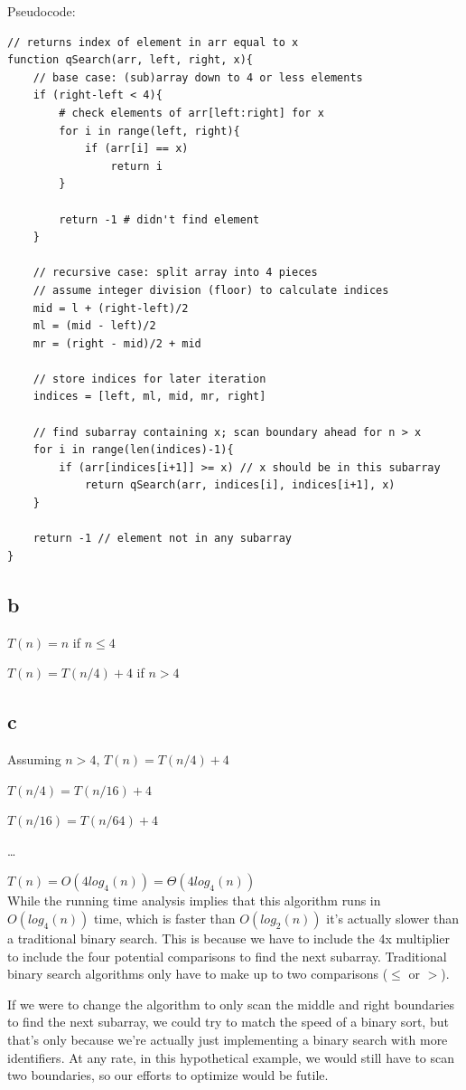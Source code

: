 \documentclass[10pt,a4paper]{report}
\begin{document}
	\newpage
	Pseudocode:
\begin{lstlisting}
// returns index of element in arr equal to x
function qSearch(arr, left, right, x){
	// base case: (sub)array down to 4 or less elements
	if (right-left < 4){
		# check elements of arr[left:right] for x
		for i in range(left, right){
			if (arr[i] == x)
				return i
		}
	
		return -1 # didn't find element
	}
	
	// recursive case: split array into 4 pieces
	// assume integer division (floor) to calculate indices
	mid = l + (right-left)/2
	ml = (mid - left)/2
	mr = (right - mid)/2 + mid
	
	// store indices for later iteration
	indices = [left, ml, mid, mr, right]
	
	// find subarray containing x; scan boundary ahead for n > x
	for i in range(len(indices)-1){
		if (arr[indices[i+1]] >= x) // x should be in this subarray
			return qSearch(arr, indices[i], indices[i+1], x)
	}
	
	return -1 // element not in any subarray
}
\end{lstlisting}
	
	\newpage
	\subsection*{b}
	$T(n) = n$ if $n \le 4$
	
	\noindent
	$T(n) = T(n/4) + 4$ if $n > 4$
	
	\subsection*{c}
	Assuming $n > 4$, $T(n) = T(n/4) + 4$
	
	$T(n/4) = T(n/16) + 4$
	
	$T(n/16) = T(n/64) + 4$
	
	\dots
	
	$T(n) = O(4log_4(n)) = \Theta(4log_4(n))$
	\\
	
	While the running time analysis implies that this algorithm runs in $O(log_4(n))$ time, which is faster than $O(log_2(n))$ it's actually slower than a traditional binary search. This is because we have to include the 4x multiplier to include the four potential comparisons to find the next subarray. Traditional binary search algorithms only have to make up to two comparisons ($\le$ or $>$). 
	
	If we were to change the algorithm to only scan the middle and right boundaries to find the next subarray, we could try to match the speed of a binary sort, but that's only because we're actually just implementing a binary search with more identifiers. At any rate, in this hypothetical example, we would still have to scan two boundaries, so our efforts to optimize would be futile.
	
\end{document}
